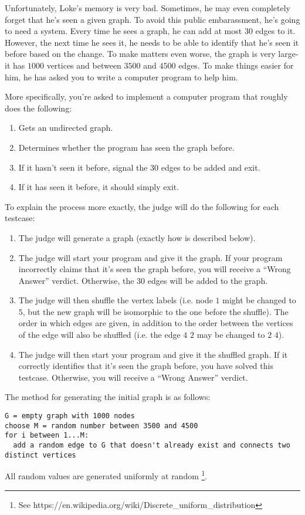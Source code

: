 \noindent
Unfortunately, Loke's memory is very bad. Sometimes, he may even completely forget that he's seen a given graph. 
To avoid this public embarassment, he's going to need a system. Every time he sees a graph, he can add at most $30$
edges to it. However, the next time he sees it, he needs to be able to identify that he's seen it before based on the
change. To make matters even worse, the graph is very large- it has $1000$ vertices and between $3500$ and $4500$ edges.
To make things easier for him, he has asked you to write a computer program to help him.

More specifically, you're asked to implement a computer program that roughly does the following:
\begin{enumerate}
  \item Gets an undirected graph.
  \item Determines whether the program has seen the graph before.
  \item If it hasn't seen it before, signal the $30$ edges to be added and exit.
  \item If it has seen it before, it should simply exit.
\end{enumerate}
To explain the process more exactly, the judge will do the following for each testcase:
\begin{enumerate}
  \item The judge will generate a graph (exactly how is described below).
  \item The judge will start your program and give it the graph. If your program incorrectly claims that it's seen the graph before,
  you will receive a ``Wrong Answer'' verdict. Otherwise, the $30$ edges will be added to the graph.
  \item The judge will then shuffle the vertex labels (i.e. node $1$ might be changed to $5$, but the new
  graph will be isomorphic to the one before the shuffle). The order in which edges are given, in addition to the
  order between the vertices of the edge will also be shuffled (i.e. the edge $4$ $2$ may be changed to $2$ $4$).
  \item The judge will then start your program and give it the shuffled graph. If it correctly identifies that
  it's seen the graph before, you have solved this testcase. Otherwise, you will receive a ``Wrong Answer'' verdict.
\end{enumerate}


The method for generating the initial graph is as follows:
\begin{verbatim}
G = empty graph with 1000 nodes
choose M = random number between 3500 and 4500
for i between 1...M:
  add a random edge to G that doesn't already exist and connects two distinct vertices
\end{verbatim}
All random values are generated uniformly at random \footnote{See https://en.wikipedia.org/wiki/Discrete\_uniform\_distribution}.

